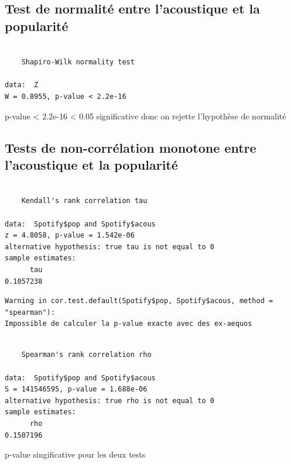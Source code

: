 \documentclass[french,]{compterendu}
\theoremstyle{urcastyle}
\theoremstyle{remark}
\begin{document}
\hypertarget{TestNorm3}{%
\subsection{Test de normalité entre l'acoustique et la popularité}\label{TestNorm3}}

\begin{verbatim}

    Shapiro-Wilk normality test

data:  Z
W = 0.8955, p-value < 2.2e-16
\end{verbatim}

p-value \textless{} 2.2e-16 \textless{} 0.05 significative donc on rejette l'hypothèse de normalité

\hypertarget{TestCor3}{%
\subsection{Tests de non-corrélation monotone entre l'acoustique et la popularité}\label{TestCor3}}

\begin{verbatim}

    Kendall's rank correlation tau

data:  Spotify$pop and Spotify$acous
z = 4.8058, p-value = 1.542e-06
alternative hypothesis: true tau is not equal to 0
sample estimates:
      tau 
0.1057238 
\end{verbatim}

\begin{verbatim}
Warning in cor.test.default(Spotify$pop, Spotify$acous, method = "spearman"):
Impossible de calculer la p-value exacte avec des ex-aequos
\end{verbatim}

\begin{verbatim}

    Spearman's rank correlation rho

data:  Spotify$pop and Spotify$acous
S = 141546595, p-value = 1.688e-06
alternative hypothesis: true rho is not equal to 0
sample estimates:
      rho 
0.1507196 
\end{verbatim}

p-value singificative pour les deux tests



\pagebreak
{}
\printbibliography[title={Bibliographie}, nottype=online, nottype=manual]
\printbibliography[title={Webographie}, type=online]
\printbibliography[title={Packages référencés}, type=manual]
\end{document}
